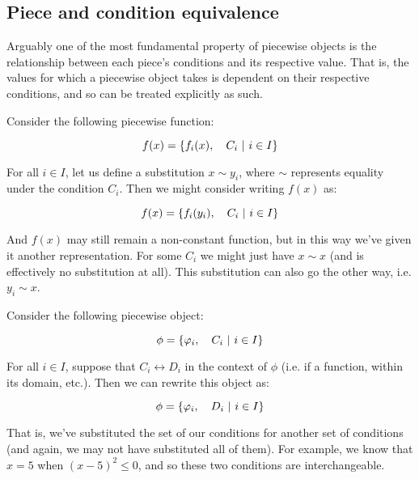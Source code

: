 \subsection{Piece and condition equivalence}
Arguably one of the most fundamental property of piecewise objects is the relationship between each piece's conditions and its respective value. That is, the values for which a piecewise object takes is dependent on their respective conditions, and so can be treated explicitly as such.

\begin{theorem}
    Consider the following piecewise function:

    $$
        f(x) = \left\{f_i(x),\quad C_i\ \middle|\ i\in I\right\}
    $$

    For all $i\in I$, let us define a substitution $x\sim y_i$, where $\sim$ represents equality under the condition $C_i$. Then we might consider writing $f(x)$ as:

    $$
        f(x) = \left\{f_i(y_i),\quad C_i\ \middle|\ i\in I\right\}
    $$

    And $f(x)$ may still remain a non-constant function, but in this way we've given it another representation. For some $C_i$ we might just have $x\sim x$ (and is effectively no substitution at all). This substitution can also go the other way, i.e. $y_i\sim x$.
\end{theorem}

\begin{theorem}
    Consider the following piecewise object:

    $$
        \phi=\left\{\varphi_i,\quad C_i\ \middle|\ i\in I\right\}
    $$

    For all $i\in I$, suppose that $C_i \leftrightarrow D_i$ in the context of $\phi$ (i.e. if a function, within its domain, etc.). Then we can rewrite this object as:

    $$
        \phi=\left\{\varphi_i,\quad D_i\ \middle|\ i\in I\right\}
    $$

    That is, we've substituted the set of our conditions for another set of conditions (and again, we may not have substituted all of them). For example, we know that $x=5$ when $(x-5)^2\leq 0$, and so these two conditions are interchangeable.
\end{theorem}

